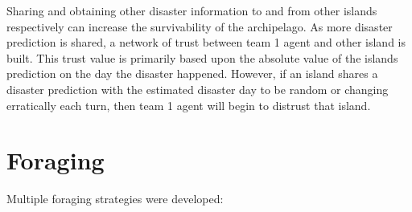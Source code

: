Sharing and obtaining other disaster information to and from other islands respectively can increase the survivability of the archipelago. As more disaster prediction is shared, a network of trust between team 1 agent and other island is built. This trust value is primarily based upon the absolute value of the islands prediction on the day the disaster happened. However, if an island shares a disaster prediction with the estimated disaster day to be random or changing erratically each turn, then team 1 agent will begin to distrust that island. 

\section{Foraging}
Multiple foraging strategies were developed: 
